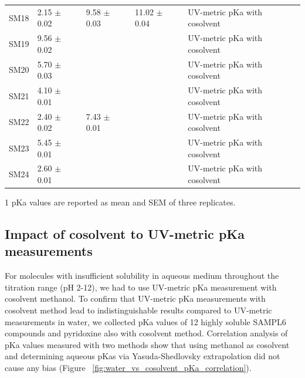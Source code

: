 \documentclass[9pt,lineno]{elife}
\begin{document}
\begin{table}[tb!]
\begin{center}
\begin{threeparttable}
\begin{tabular}{@{}lllll@{}}
SM18 & 2.15 $\pm$ 0.02 & 9.58 $\pm$ 0.03 & 11.02 $\pm$ 0.04 & UV-metric pKa with cosolvent \\
SM19 & 9.56 $\pm$ 0.02 &  &  & UV-metric pKa with cosolvent \\
SM20 & 5.70 $\pm$ 0.03 &  &  & UV-metric pKa with cosolvent \\
SM21 & 4.10 $\pm$ 0.01 &  &  & UV-metric pKa with cosolvent \\
SM22 & 2.40 $\pm$ 0.02 & 7.43 $\pm$ 0.01 &  & UV-metric pKa with cosolvent \\
SM23 & 5.45 $\pm$ 0.01 &  &  & UV-metric pKa with cosolvent \\
SM24 & 2.60 $\pm$ 0.01 &  &  & UV-metric pKa with cosolvent \\ \bottomrule
\end{tabular}
\begin{tablenotes}
\item[1] pKa values are reported as mean and SEM of three replicates.
\end{tablenotes}
\end{threeparttable}
\end{center}
\end{table}

\subsection{Impact of cosolvent to UV-metric pKa measurements}
For molecules with insufficient solubility in aqueous medium throughout the titration range (pH 2-12), we had to use UV-metric pKa measurement with cosolvent methanol. To confirm that UV-metric pKa measurements with cosolvent method lead to indistinguishable results compared to UV-metric measurements in water, we collected pKa values of 12 highly soluble SAMPL6 compounds and pyridoxine also with cosolvent method. Correlation analysis of pKa values measured with two methods show that using methanol as cosolvent and determining aqueous pKas via Yasuda-Shedlovsky extrapolation did not cause any bias (Figure ~\ref{fig:water_vs_cosolvent_pKa_correlation}). 
\end{document}
